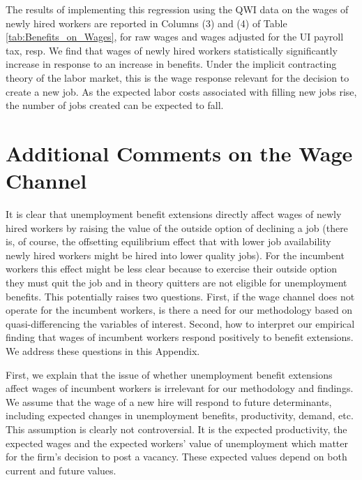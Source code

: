 \documentclass[12pt]{article}
\newcommand{\1}{\mathbf{1}}
\begin{document}
\begin{appendix}
The results of implementing this regression using the QWI data on the wages of newly hired workers are reported in Columns (3) and (4) of Table \ref{tab:Benefits_on_Wages}, for raw wages and wages adjusted for the UI payroll tax, resp. We find that wages of newly hired workers statistically significantly increase in response to an increase in benefits. Under the implicit contracting theory of the labor market, this is the wage response relevant for the decision to create a new job. As the expected labor costs associated with filling new jobs rise, the number of jobs created can be expected to fall.



\section{Additional Comments on the Wage Channel}
\label{app:wage_channel}

It is clear that unemployment benefit extensions directly affect wages of newly hired workers by raising the value of the outside option of declining a job (there is, of course, the offsetting equilibrium effect that with lower job availability newly hired workers might be hired into lower quality jobs). For the incumbent workers this effect might be less clear because to exercise their outside option they must quit the job and in theory quitters are not eligible for unemployment benefits. This potentially raises two questions. First, if the wage channel does not operate for the incumbent workers, is there a need for our methodology based on quasi-differencing the variables of interest. Second, how to interpret our empirical finding that wages of incumbent workers respond positively to benefit extensions. We address these questions in this Appendix.


First, we explain that the issue of whether unemployment benefit extensions affect wages of incumbent workers is irrelevant for our methodology and findings. We assume that the wage of a new hire will respond to future determinants, including expected changes in unemployment benefits, productivity, demand, etc. This assumption is clearly not controversial. It is the expected productivity, the expected wages and the expected workers' value of unemployment which matter for the firm's decision to post a vacancy. These expected values depend on both current and future values.


\end{appendix}
\end{document}

